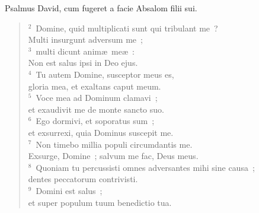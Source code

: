 \bchapter
\lettrine[lines=3,image=true,loversize=0.05,lraise=-0.03]{P}{}salmus David, cum fugeret a facie Absalom filii sui.
\begin{flushleft}\begin{verse}\vspace{6pt}${}^{2}$~Domine, quid multiplicati sunt qui tribulant me~?\\ Multi insurgunt adversum me~;\\
${}^{3}$~multi dicunt anim\ae\ me\ae~:\\ Non est salus ipsi in Deo ejus.\\
${}^{4}$~Tu autem Domine, susceptor meus es,\\ gloria mea, et exaltans caput meum.\\
${}^{5}$~Voce mea ad Dominum clamavi~;\\ et exaudivit me de monte sancto suo.\\
${}^{6}$~Ego dormivi, et soporatus sum~;\\ et exsurrexi, quia Dominus suscepit me.\\
${}^{7}$~Non timebo millia populi circumdantis me.\\ Exsurge, Domine~; salvum me fac, Deus meus.\\
${}^{8}$~Quoniam tu percussisti omnes adversantes mihi sine causa~;\\ dentes peccatorum contrivisti.\\
${}^{9}$~Domini est salus~;\\ et super populum tuum benedictio tua.\end{verse}\end{flushleft}



